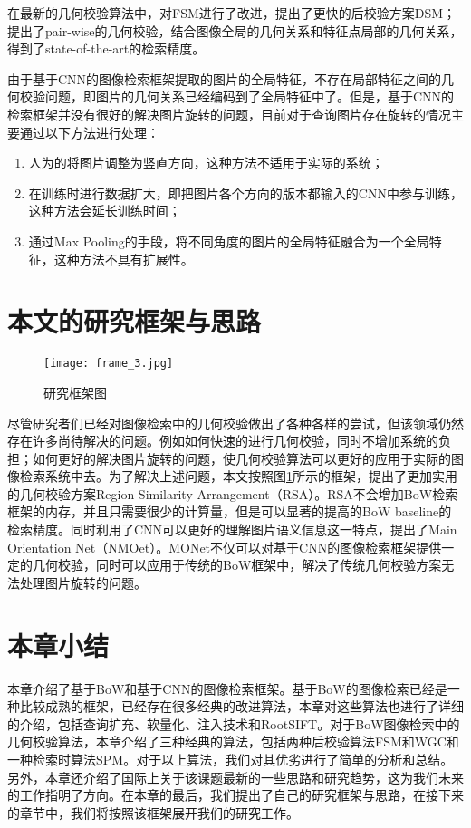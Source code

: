 在最新的几何校验算法中，\cite{Zhong2015Fast}对FSM进行了改进，提出了更快的后校验方案DSM；\cite{li2015pairwise}提出了pair-wise的几何校验，结合图像全局的几何关系和特征点局部的几何关系，得到了state-of-the-art的检索精度。

由于基于CNN的图像检索框架提取的图片的全局特征，不存在局部特征之间的几何校验问题，即图片的几何关系已经编码到了全局特征中了。但是，基于CNN的检索框架并没有很好的解决图片旋转的问题，目前对于查询图片存在旋转的情况主要通过以下方法进行处理：
\begin{enumerate}
	\item 人为的将图片调整为竖直方向\cite{babenko2014neural}，这种方法不适用于实际的系统；
	\item 在训练时进行数据扩大，即把图片各个方向的版本都输入的CNN中参与训练\cite{babenko2014neural}，这种方法会延长训练时间；
	\item 通过Max Pooling的手段，将不同角度的图片的全局特征融合为一个全局特征\cite{chandrasekhar2015practical}，这种方法不具有扩展性。
\end{enumerate}


\section{本文的研究框架与思路}
\begin{figure}[h]
	\centering
	\texttt{[image: frame\_3.jpg]}
	\caption{研究框架图}\label{fig:frame}
\end{figure}
尽管研究者们已经对图像检索中的几何校验做出了各种各样的尝试，但该领域仍然存在许多尚待解决的问题。例如如何快速的进行几何校验，同时不增加系统的负担；如何更好的解决图片旋转的问题，使几何校验算法可以更好的应用于实际的图像检索系统中去。为了解决上述问题，本文按照图\ref{fig:frame}所示的框架，提出了更加实用的几何校验方案Region Similarity Arrangement（RSA）。RSA不会增加BoW检索框架的内存，并且只需要很少的计算量，但是可以显著的提高的BoW baseline的检索精度。同时利用了CNN可以更好的理解图片语义信息这一特点，提出了Main Orientation Net（NMOet）。MONet不仅可以对基于CNN的图像检索框架提供一定的几何校验，同时可以应用于传统的BoW框架中，解决了传统几何校验方案无法处理图片旋转的问题。

\section{本章小结}
本章介绍了基于BoW和基于CNN的图像检索框架。基于BoW的图像检索已经是一种比较成熟的框架，已经存在很多经典的改进算法，本章对这些算法也进行了详细的介绍，包括查询扩充、软量化、注入技术和RootSIFT。对于BoW图像检索中的几何校验算法，本章介绍了三种经典的算法，包括两种后校验算法FSM和WGC和一种检索时算法SPM。对于以上算法，我们对其优劣进行了简单的分析和总结。另外，本章还介绍了国际上关于该课题最新的一些思路和研究趋势，这为我们未来的工作指明了方向。在本章的最后，我们提出了自己的研究框架与思路，在接下来的章节中，我们将按照该框架展开我们的研究工作。

